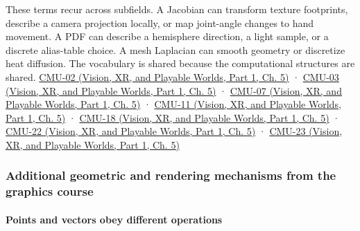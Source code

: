 These terms recur across subfields. A Jacobian can transform texture footprints, describe a camera projection locally, or map joint-angle changes to hand movement. A PDF can describe a hemisphere direction, a light sample, or a discrete alias-table choice. A mesh Laplacian can smooth geometry or discretize heat diffusion. The vocabulary is shared because the computational structures are shared. \href{../07-Vision-XR-and-Playable-Worlds-P01/main.pdf\#04-visual-computing-ii-ch036-cmu-02---linear-algebra-preview}{CMU-02 (Vision, XR, and Playable Worlds, Part 1, Ch. 5)} · \href{../07-Vision-XR-and-Playable-Worlds-P01/main.pdf\#04-visual-computing-ii-ch036-cmu-03---vector-calculus-preview}{CMU-03 (Vision, XR, and Playable Worlds, Part 1, Ch. 5)} · \href{../07-Vision-XR-and-Playable-Worlds-P01/main.pdf\#04-visual-computing-ii-ch036-cmu-07---perspective-projection-and-texture-mapping}{CMU-07 (Vision, XR, and Playable Worlds, Part 1, Ch. 5)} · \href{../07-Vision-XR-and-Playable-Worlds-P01/main.pdf\#04-visual-computing-ii-ch036-cmu-11---digital-geometry-processing}{CMU-11 (Vision, XR, and Playable Worlds, Part 1, Ch. 5)} · \href{../07-Vision-XR-and-Playable-Worlds-P01/main.pdf\#04-visual-computing-ii-ch036-cmu-18---monte-carlo-rendering}{CMU-18 (Vision, XR, and Playable Worlds, Part 1, Ch. 5)} · \href{../07-Vision-XR-and-Playable-Worlds-P01/main.pdf\#04-visual-computing-ii-ch036-cmu-22---optimization}{CMU-22 (Vision, XR, and Playable Worlds, Part 1, Ch. 5)} · \href{../07-Vision-XR-and-Playable-Worlds-P01/main.pdf\#04-visual-computing-ii-ch036-cmu-23---physically-based-animation-and-pdes}{CMU-23 (Vision, XR, and Playable Worlds, Part 1, Ch. 5)}

\subsubsection{Additional geometric and rendering mechanisms from the graphics course}\label{03-visual-computing-i-ch001-additional-geometric-and-rendering-mechanisms-from-the-graphics-course}

\hypertarget{03-visual-computing-i-ch001-additional-geometric-and-rendering-mechanisms-from-the-graphics-course}{}

\paragraph{Points and vectors obey different operations}\label{03-visual-computing-i-ch001-points-and-vectors-obey-different-operations}

\hypertarget{03-visual-computing-i-ch001-points-and-vectors-obey-different-operations}{}


